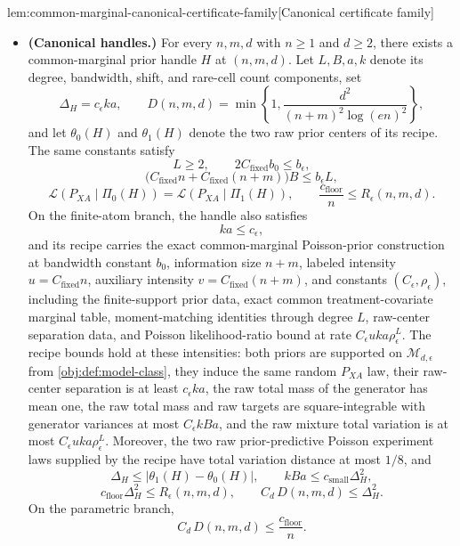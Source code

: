 \documentclass[11pt]{article}
\begin{document}
\begin{lemmav}{lem:common-marginal-canonical-certificate-family}[Canonical certificate family]
\begin{itemize}
\item \textbf{(Canonical handles.)}
For every \(n,m,d\) with \(n\ge1\) and \(d\ge2\), there exists a common-marginal prior handle \(H\) at \((n,m,d)\).  Let \(L,B,a,k\) denote its degree, bandwidth, shift, and rare-cell count components, set
\[
\Delta_H=c_\epsilon ka,
\qquad
D(n,m,d)=\min\left\{1,\frac{d^2}{(n+m)^2\log(en)^2}\right\},
\]
and let \(\theta_0(H)\) and \(\theta_1(H)\) denote the two raw prior centers of its recipe.  The same constants satisfy
\[
L\ge2,
\qquad
2C_{\mathrm{fixed}}b_0\le b_\epsilon,
\]
\[
\bigl(C_{\mathrm{fixed}}n+C_{\mathrm{fixed}}(n+m)\bigr)B
\le
b_\epsilon L,
\]
\[
\mathcal L(P_{XA}\mid \Pi_0(H))
=
\mathcal L(P_{XA}\mid \Pi_1(H)),
\qquad
\frac{c_{\mathrm{floor}}}{n}\le R_\epsilon(n,m,d).
\]
On the finite-atom branch, the handle also satisfies
\[
ka\le c_\epsilon,
\]
and its recipe carries the exact common-marginal Poisson-prior construction at bandwidth constant \(b_0\), information size \(n+m\), labeled intensity \(u=C_{\mathrm{fixed}}n\), auxiliary intensity \(v=C_{\mathrm{fixed}}(n+m)\), and constants \((C_\epsilon,\rho_\epsilon)\), including the finite-support prior data, exact common treatment-covariate marginal table, moment-matching identities through degree \(L\), raw-center separation data, and Poisson likelihood-ratio bound at rate \(C_\epsilon u k a\rho_\epsilon^L\).  The recipe bounds hold at these intensities: both priors are supported on \(\mathcal M_{d,\epsilon}\) from \cref{obj:def:model-class}, they induce the same random \(P_{XA}\) law, their raw-center separation is at least \(c_\epsilon ka\), the raw total mass of the generator has mean one, the raw total mass and raw targets are square-integrable with generator variances at most \(C_\epsilon kBa\), and the raw mixture total variation is at most \(C_\epsilon u k a\rho_\epsilon^L\).  Moreover, the two raw prior-predictive Poisson experiment laws supplied by the recipe have total variation distance at most \(1/8\), and
\[
\Delta_H\le
\left|\theta_1(H)-\theta_0(H)\right|,
\qquad
kBa\le c_{\mathrm{small}}\Delta_H^2,
\]
\[
c_{\mathrm{floor}}\Delta_H^2\le R_\epsilon(n,m,d),
\qquad
C_d\,D(n,m,d)\le \Delta_H^2.
\]
On the parametric branch,
\[
C_d\,D(n,m,d)\le \frac{c_{\mathrm{floor}}}{n}.
\]
\end{itemize}
\end{lemmav}
\end{document}
